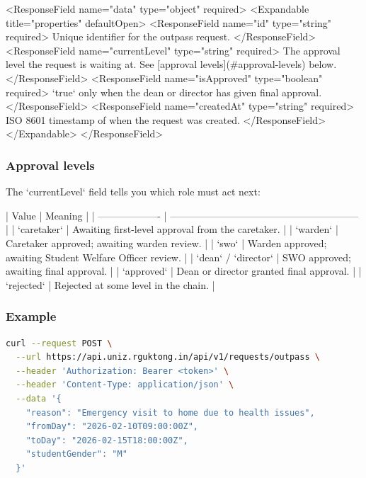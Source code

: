 <ResponseField name="data" type="object" required>
  <Expandable title="properties" defaultOpen>
    <ResponseField name="id" type="string" required>
      Unique identifier for the outpass request.
    </ResponseField>
    <ResponseField name="currentLevel" type="string" required>
      The approval level the request is waiting at. See [approval
      levels](#approval-levels) below.
    </ResponseField>
    <ResponseField name="isApproved" type="boolean" required>
      `true` only when the dean or director has given final approval.
    </ResponseField>
    <ResponseField name="createdAt" type="string" required>
      ISO 8601 timestamp of when the request was created.
    </ResponseField>
  </Expandable>
</ResponseField>

\subsubsection{Approval levels}

The `currentLevel` field tells you which role must act next:

| Value               | Meaning                                                   |
| ------------------- | --------------------------------------------------------- |
| `caretaker`         | Awaiting first-level approval from the caretaker.         |
| `warden`            | Caretaker approved; awaiting warden review.               |
| `swo`               | Warden approved; awaiting Student Welfare Officer review. |
| `dean` / `director` | SWO approved; awaiting final approval.                    |
| `approved`          | Dean or director granted final approval.                  |
| `rejected`          | Rejected at some level in the chain.                      |

\subsubsection{Example}

\begin{lstlisting}[language=bash]
curl --request POST \
  --url https://api.uniz.rguktong.in/api/v1/requests/outpass \
  --header 'Authorization: Bearer <token>' \
  --header 'Content-Type: application/json' \
  --data '{
    "reason": "Emergency visit to home due to health issues",
    "fromDay": "2026-02-10T09:00:00Z",
    "toDay": "2026-02-15T18:00:00Z",
    "studentGender": "M"
  }'

\end{lstlisting}

